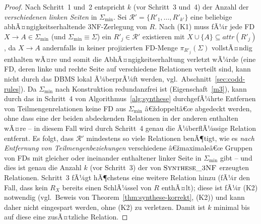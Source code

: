 ﻿\documentclass[a4paper,12pt]{report}
\theoremstyle{definition}
\theoremstyle{remark}
\newcommand{\att}{\mathit{attr}}
\begin{document}
\begin{proof}
Nach Schritt~1 und~2 entspricht $k$ (vor Schritt~3 und~4) der Anzahl
der \emph{verschiedenen linken Seiten} in $\Sigma_{\min}$. Sei
$\mathcal{R}'=\{R'_1,\ldots,R'_{k'}\}$ eine beliebige
abhÃ¤ngigkeitserhaltende 3NF-Zerlegung von $R$. Nach (K1) muss fÃ¼r jede
FD $X\to A\in\Sigma_{\min}$ (und $\Sigma_{\min}\equiv\Sigma$) ein
$R'_j\in\mathcal{R}'$ existieren mit $X\cup\{A\}\subseteq\att(R'_j)$,
da $X\to A$ andernfalls in keiner projizierten FD-Menge
$\pi_{R'_j}(\Sigma)$ vollstÃ¤ndig enthalten wÃ¤re und somit die
AbhÃ¤ngigkeitserhaltung verletzt wÃ¼rde (eine FD, deren linke und rechte
Seite auf verschiedene Relationen verteilt sind, kann nicht durch das
DBMS lokal Ã¼berprÃ¼ft werden, vgl.\ Abschnitt~\ref{sec:codd-rules}).
Da $\Sigma_{\min}$ nach Konstruktion redundanzfrei ist
(Eigenschaft~\ref{m3}), kann durch das in Schritt~4 von
Algorithmus~\ref{alg:synthese} durchgefÃ¼hrte Entfernen von
Teilmengenrelationen keine FD aus $\Sigma_{\min}$ â€ždoppeltâ€œ
abgedeckt werden, ohne dass eine der beiden abdeckenden Relationen in
der anderen enthalten wÃ¤re -- in diesem Fall wird durch Schritt~4
genau die Ã¼berflÃ¼ssige Relation entfernt. Es folgt, dass
$\mathcal{R}'$ mindestens so viele Relationen benÃ¶tigt, wie es
\emph{nach Entfernung von Teilmengenbeziehungen} verschiedene
â€žmaximaleâ€œ Gruppen von FDs mit gleicher oder ineinander enthaltener
linker Seite in $\Sigma_{\min}$ gibt -- und dies ist genau die Anzahl
$k$ (vor Schritt~3) der von $\textsc{Synthese\_3NF}$ erzeugten
Relationen. Schritt~3 fÃ¼gt hÃ¶chstens eine weitere Relation hinzu (fÃ¼r
den Fall, dass kein $R_X$ bereits einen SchlÃ¼ssel von $R$ enthÃ¤lt);
diese ist fÃ¼r (K2) notwendig (vgl.\ Beweis von Theorem~\ref{thm:synthese-korrekt},
(K2)) und kann daher nicht eingespart werden, ohne (K2) zu verletzen.
Damit ist $k$ minimal bis auf diese eine zusÃ¤tzliche Relation. \qedhere
\end{proof}
\end{document}
